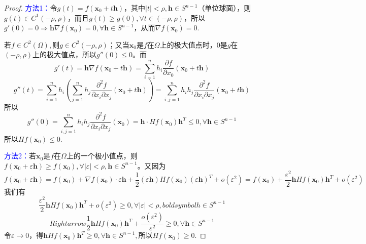 \documentclass[UTF8]{ctexart}
\newcommand{\p}[2]{\frac{\partial #1}{\partial #2}}
\begin{document}
    \begin{proof}
        \textcolor{blue}{方法1：}令$g(t)=f(\boldsymbol{x}_0+t\boldsymbol{h})$，其中$|t|<\rho,\boldsymbol{h}\in S^{n-1}$（单位球面），则$g(t)\in C^1(-\rho,\rho)$，而且$g(t)\ge g(0),\forall t\in(-\rho,\rho)$，所以$g'(0)=0\Rightarrow \boldsymbol{h}\nabla f(\boldsymbol{x}_0)=0,\forall\boldsymbol{h}\in S^{n-1}$，从而$\nabla f(\boldsymbol{x}_0)=0$.

        若$f\in C^2(\Omega),$则$g\in C^2(-\rho,\rho)$；又当$\boldsymbol{x}_0$是$f$在$\Omega$上的极大值点时，$0$是$g$在$(-\rho,\rho)$上的极大值点，所以$g''(0)\le 0$。而
        $$g'(t)=\boldsymbol{h}\nabla f(\boldsymbol{x}_0+t\boldsymbol{h})=\sum_{i=1}^nh_i\p{f}{x_0}(\boldsymbol{x}_0+t\boldsymbol{h})$$
        $$g''(t)=\sum_{i=1}^nh_i\left(\sum_{j=1}^nh_j\frac{\partial^2f}{\partial x_i\partial x_j}(\boldsymbol{x}_0+t\boldsymbol{h})\right)=\sum_{i,j=1}^nh_ih_j\frac{\partial^2f}{\partial x_i\partial x_j}(\boldsymbol{x}_0+t\boldsymbol{h})$$
        所以$$g''(0)=\sum_{i,j=1}^nh_ih_j\frac{\partial^2f}{\partial x_i\partial x_j}(\boldsymbol{x}_0)=\boldsymbol{h}\cdot Hf(\boldsymbol{x}_0)\boldsymbol{h}^T\le 0,\forall\boldsymbol{h}\in S^{n-1}$$
        所以$Hf(\boldsymbol{x}_0)\le 0$.

        \textcolor{blue}{方法2：}若$\boldsymbol{x}_0$是$f$在$\Omega$上的一个极小值点，则$f(\boldsymbol{x}_0+\varepsilon\boldsymbol{h})\ge f(\boldsymbol{x}_0),\forall|\varepsilon|<\rho,\boldsymbol{h}\in S^{n-1}$。又因为
        $$f(\boldsymbol{x}_0+\varepsilon\boldsymbol{h})=f(\boldsymbol{x}_0)+\nabla f(\boldsymbol{x}_0)\cdot\varepsilon\boldsymbol{h}+\frac{1}{2}(\varepsilon\boldsymbol{h})Hf(\boldsymbol{x}_0)(\varepsilon\boldsymbol{h})^T+o(\varepsilon^2)=f(\boldsymbol{x}_0)+\frac{\varepsilon^2}{2}\boldsymbol{h}Hf(\boldsymbol{x}_0)\boldsymbol{h}^T+o(\varepsilon^2)$$
        我们有
        $$\frac{\varepsilon^2}{2}\boldsymbol{h}Hf(\boldsymbol{x}_0)\boldsymbol{h}^T+o(\varepsilon^2)\ge 0,\forall|\varepsilon|<\rho,
        boldsymbol{h}\in S^{n-1}$$
        $$Rightarrow\frac{1}{2}\boldsymbol{h}Hf(\boldsymbol{x}_0)\boldsymbol{h}^T+\frac{o(\varepsilon^2)}{\varepsilon^2}\ge 0,\forall\boldsymbol{h}\in S^{n-1}$$
        令$\varepsilon\to 0$，得$\boldsymbol{h}Hf(\boldsymbol{x}_0)\boldsymbol{h}^T\ge 0,\forall\boldsymbol{h}\in S^{n-1},$所以$Hf(\boldsymbol{x}_0)\ge 0$.
    \end{proof}
\end{document}

